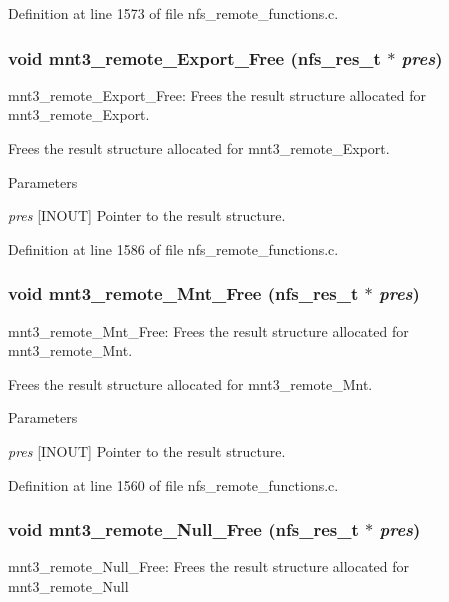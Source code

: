 Definition at line 1573 of file nfs\_\-remote\_\-functions.c.
\subsubsection[{mnt3\_\-remote\_\-Export\_\-Free}]{\setlength{\rightskip}{0pt plus 5cm}void mnt3\_\-remote\_\-Export\_\-Free (nfs\_\-res\_\-t $\ast$ {\em pres})}\label{group__NFSprocs_ga31328cb5471dbffad50ccb982f4c68de}
mnt3\_\-remote\_\-Export\_\-Free: Frees the result structure allocated for mnt3\_\-remote\_\-Export.

Frees the result structure allocated for mnt3\_\-remote\_\-Export.


\begin{DoxyParams}{Parameters}
\item[{\em pres}][INOUT] Pointer to the result structure. \end{DoxyParams}


Definition at line 1586 of file nfs\_\-remote\_\-functions.c.
\subsubsection[{mnt3\_\-remote\_\-Mnt\_\-Free}]{\setlength{\rightskip}{0pt plus 5cm}void mnt3\_\-remote\_\-Mnt\_\-Free (nfs\_\-res\_\-t $\ast$ {\em pres})}\label{group__NFSprocs_ga60463b94ce11f43165d9c43ff8e8450c}
mnt3\_\-remote\_\-Mnt\_\-Free: Frees the result structure allocated for mnt3\_\-remote\_\-Mnt.

Frees the result structure allocated for mnt3\_\-remote\_\-Mnt.


\begin{DoxyParams}{Parameters}
\item[{\em pres}][INOUT] Pointer to the result structure. \end{DoxyParams}


Definition at line 1560 of file nfs\_\-remote\_\-functions.c.
\subsubsection[{mnt3\_\-remote\_\-Null\_\-Free}]{\setlength{\rightskip}{0pt plus 5cm}void mnt3\_\-remote\_\-Null\_\-Free (nfs\_\-res\_\-t $\ast$ {\em pres})}\label{group__NFSprocs_ga8c0b570a18705f3c27bf1a41561f6131}
mnt3\_\-remote\_\-Null\_\-Free: Frees the result structure allocated for mnt3\_\-remote\_\-Null

